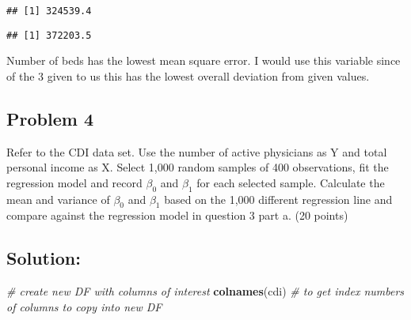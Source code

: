 \documentclass[
]{article}
\newenvironment{Shaded}{\begin{snugshade}}{\end{snugshade}}
\newcommand{\CommentTok}[1]{\textcolor[rgb]{0.56,0.35,0.01}{\textit{#1}}}
\newcommand{\DecValTok}[1]{\textcolor[rgb]{0.00,0.00,0.81}{#1}}
\newcommand{\KeywordTok}[1]{\textcolor[rgb]{0.13,0.29,0.53}{\textbf{#1}}}
\newcommand{\NormalTok}[1]{#1}
\newcommand{\OperatorTok}[1]{\textcolor[rgb]{0.81,0.36,0.00}{\textbf{#1}}}
\newcommand{\StringTok}[1]{\textcolor[rgb]{0.31,0.60,0.02}{#1}}
\begin{document}
\begin{verbatim}
## [1] 324539.4
\end{verbatim}

\begin{Shaded}
\end{Shaded}

\begin{verbatim}
## [1] 372203.5
\end{verbatim}

Number of beds has the lowest mean square error. I would use this
variable since of the 3 given to us this has the lowest overall
deviation from given values.

\hypertarget{problem-4}{%
\subsection{Problem 4}\label{problem-4}}

Refer to the CDI data set. Use the number of active physicians as Y and
total personal income as X. Select 1,000 random samples of 400
observations, fit the regression model and record \(\beta_{0}\) and
\(\beta_{1}\) for each selected sample. Calculate the mean and variance
of \(\beta_{0}\) and \(\beta_{1}\) based on the 1,000 different
regression line and compare against the regression model in question 3
part a. (20 points)

\hypertarget{solution}{%
\subsection{Solution:}\label{solution}}

\begin{Shaded}
\begin{Highlighting}[]
\CommentTok{# create new DF with columns of interest}
\KeywordTok{colnames}\NormalTok{(cdi) }\CommentTok{# to get index numbers of columns to copy into new DF}
\end{Highlighting}
\end{Shaded}
\end{document}
